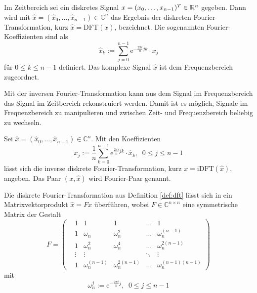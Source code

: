 \begin{defi}
    \label{def:dft}
    Im Zeitbereich sei ein diskretes Signal $x=(x_0, \ldots, x_{n-1})^T \in \mathbb{R}^n$ gegeben. Dann wird mit $\hat{x}=(\hat{x}_0, \ldots, \hat{x}_{n-1}) \in \mathbb{C}^n$ das Ergebnis der diskreten Fourier-Transformation, kurz $\hat{x}=\mathrm{DFT}(x)$, bezeichnet. Die sogenannten Fourier-Koeffizienten sind als 
    \begin{equation*}
        \hat{x}_k:=\sum_{j=0}^{n-1} \mathrm{e}^{- \frac{2 \pi i}{n} j k} \cdot x_j
    \end{equation*}
    für $0 \leq k \leq n-1$ definiert. Das komplexe Signal $\hat{x}$ ist dem Frequenzbereich zugeordnet.
\end{defi}
Mit der inversen Fourier-Transformation kann aus dem Signal im Frequenzbereich das Signal im Zeitbereich rekonstruiert werden. Damit ist es möglich, Signale im Frequenzbereich zu manipulieren und zwischen Zeit- und Frequenzbereich beliebig zu wechseln.
\begin{defi}
    Sei $\hat{x}=(\hat{x}_0, \ldots, \hat{x}_{n-1}) \in \mathbb{C}^n$. Mit den Koeffizienten
    \begin{equation*}
        x_j:= \frac{1}{n} \sum_{k=0}^{n-1} \mathrm{e}^{\frac{2 \pi i}{n} j k} \cdot \hat{x}_k, \; \; 0 \leq j \leq n-1
    \end{equation*}
    lässt sich die inverse diskrete Fourier-Transformation, kurz $x=\mathrm{iDFT}(\hat{x})$, angeben. Das Paar $(x ,\hat{x})$ wird Fourier-Paar genannt.
\end{defi}
Die diskrete Fourier-Transformation aus Definition \ref{def:dft} lässt sich in ein Matrixvektorprodukt $\hat{x}=Fx$ überführen, wobei $F \in \mathbb{C}^{n \times n}$ eine symmetrische Matrix der Gestalt
\begin{equation}
    \label{eq:FM}
    F=\begin{pmatrix}
        &1 &1 &1 &\ldots &1 \\
        &1 &\omega_n &\omega_n^2 &\ldots &\omega_n^{(n-1)} \\
        &1 &\omega_n^2 &\omega_n^4 &\ldots &\omega_n^{2 (n-1)} \\
        &\vdots &\vdots & &\ddots &\vdots \\
        &1 &\omega_n^{(n-1)} &\omega_n^{2(n-1)}  &\ldots &\omega_n^{(n-1)(n-1)}
    \end{pmatrix}
\end{equation}
mit 
\begin{equation*}
    \omega_n^{j}:=\mathrm{e}^{- \frac{2 \pi i}{n} j}, \; \; 0 \leq j \leq n-1
\end{equation*}
